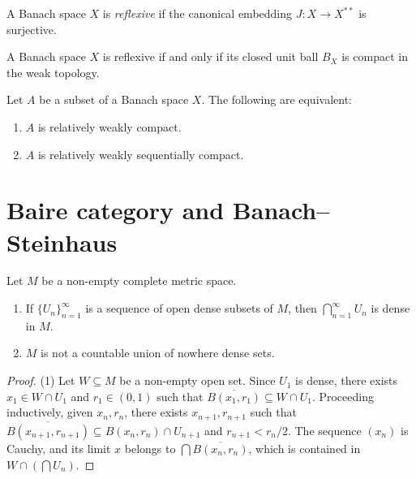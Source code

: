 \begin{definition}
\label{definition-reflexive-space}
A Banach space $X$ is {\it reflexive} if the
canonical embedding $J : X \to X^{**}$ is
surjective.
\end{definition}

\begin{theorem}[Kakutani]
\label{theorem-kakutani-reflexivity}
A Banach space $X$ is reflexive if and only
if its closed unit ball $B_X$ is compact in
the weak topology.
\end{theorem}

\begin{theorem}
\label{theorem-eberlein-smulyan}
Let $A$ be a subset of a Banach space $X$.
The following are equivalent:
\begin{enumerate}
\item $A$ is relatively weakly compact.
\item $A$ is relatively weakly sequentially
compact.
\end{enumerate}
\end{theorem}


\section
{Baire category and Banach--Steinhaus}
\label{section-baire-banach-steinhaus}

\begin{theorem}
\label{theorem-baire}
Let $M$ be a non-empty complete metric space.
\begin{enumerate}
\item If $\{U_n\}_{n=1}^\infty$ is a sequence
of open dense subsets of $M$, then
$\bigcap_{n=1}^\infty U_n$ is dense in $M$.
\item $M$ is not a countable union of nowhere
dense sets.
\end{enumerate}
\end{theorem}

\begin{proof}
(1) Let $W \subseteq M$ be a non-empty open
set. Since $U_1$ is dense, there exists $x_1
\in W \cap U_1$ and $r_1 \in (0,1)$ such that
$\overline{B(x_1, r_1)} \subseteq W \cap
U_1$. Proceeding inductively, given $x_n,
r_n$, there exists $x_{n+1}, r_{n+1}$ such
that $\overline{B(x_{n+1}, r_{n+1})}
\subseteq B(x_n, r_n) \cap U_{n+1}$ and
$r_{n+1} < r_n / 2$. The sequence $(x_n)$ is
Cauchy, and its limit $x$ belongs to $\bigcap
\overline{B(x_n, r_n)}$, which is contained
in $W \cap (\bigcap U_n)$.
\end{proof}

